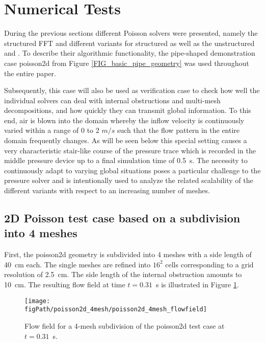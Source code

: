 \section{Numerical Tests}
\label{SEC_SCARC_Tests}
During the previous sections different Poisson solvers were presented, namely the structured FFT and different variants for structured \scarc{} as well as the unstructured \uglmat{} and \uscarc{}. To describe their algorithmic functionality, the pipe-shaped demonstration case {\ct poisson2d} from Figure \ref{FIG_basic_pipe_geometry} was used throughout the entire paper. 

Subsequently, this case will also be used as verification case to check how well the individual solvers can deal with internal obstructions and multi-mesh decompositions, and how quickly they can transmit global information.
To this end, air is blown into the domain whereby the inflow velocity is continuously varied within a range of 0 to 2 $m/s$ such that the flow pattern in the entire domain frequently changes. 
As will be seen below this special setting causes a very characteristic stair-like course of the pressure trace which is recorded in the middle pressure device up to a final simulation time of 0.5~s. 
%
The necessity to continuously adapt to varying global situations poses a particular challenge to the pressure solver and is intentionally used to analyze the related scalability of the different variants with respect to an increasing number of meshes.

\subsection{2D Poisson test case based on a subdivision into 4 meshes}
First, the {\ct poisson2d} geometry is subdivided into 4 meshes with a side length of 40~cm each. The single meshes are refined into $16^2$ cells corresponding to a grid resolution of 2.5~cm. The side length of the internal obstruction amounts to 10~cm. The resulting flow field at time $t=0.31$~s is illustrated in Figure \ref{FIG_scarc_poisson_four_flowfield}.


\begin{figure}[ht]
\begin{center}
\texttt{[image: \\figPath/poisson2d\_4mesh/poisson2d\_4mesh\_flowfield]}
\end{center}
\caption[Flow field for a 4-mesh subdivision of the {\ct poisson2d} test case]{Flow field for a 4-mesh subdivision of the {\ct poisson2d} test case at $t=0.31$~s.}
\label{FIG_scarc_poisson_four_flowfield}
\end{figure}


